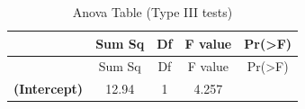 \documentclass[]{article}
\begin{document}
\begin{longtable}[]{@{}ccccc@{}}
\caption{Anova Table (Type III tests)}\tabularnewline
\toprule
\begin{minipage}[b]{0.24\columnwidth}\centering\strut
~\strut
\end{minipage} & \begin{minipage}[b]{0.11\columnwidth}\centering\strut
Sum Sq\strut
\end{minipage} & \begin{minipage}[b]{0.06\columnwidth}\centering\strut
Df\strut
\end{minipage} & \begin{minipage}[b]{0.12\columnwidth}\centering\strut
F value\strut
\end{minipage} & \begin{minipage}[b]{0.12\columnwidth}\centering\strut
Pr(\textgreater{}F)\strut
\end{minipage}\tabularnewline
\midrule
\endfirsthead
\toprule
\begin{minipage}[b]{0.24\columnwidth}\centering\strut
~\strut
\end{minipage} & \begin{minipage}[b]{0.11\columnwidth}\centering\strut
Sum Sq\strut
\end{minipage} & \begin{minipage}[b]{0.06\columnwidth}\centering\strut
Df\strut
\end{minipage} & \begin{minipage}[b]{0.12\columnwidth}\centering\strut
F value\strut
\end{minipage} & \begin{minipage}[b]{0.12\columnwidth}\centering\strut
Pr(\textgreater{}F)\strut
\end{minipage}\tabularnewline
\midrule
\endhead
\begin{minipage}[t]{0.24\columnwidth}\centering\strut
\textbf{(Intercept)}\strut
\end{minipage} & \begin{minipage}[t]{0.11\columnwidth}\centering\strut
12.94\strut
\end{minipage} & \begin{minipage}[t]{0.06\columnwidth}\centering\strut
1\strut
\end{minipage} & \begin{minipage}[t]{0.12\columnwidth}\centering\strut
4.257\strut
\end{minipage} & \begin{minipage}[t]{0.12\columnwidth}\centering\strut

\end{minipage}
\end{longtable}
\end{document}

